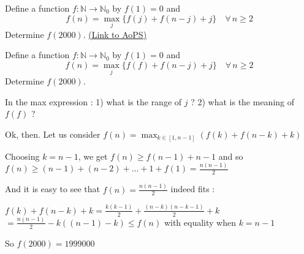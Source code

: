 \begin{problem}
	Define a function $f:\mathbb{N}\rightarrow\mathbb{N}_0$ by $f(1)=0$ and
\[f(n)=\max_j\{ f(j)+f(n-j)+j\}\quad\forall\, n\ge 2 \]
Determine $f(2000)$.
	\flushright \href{https://artofproblemsolving.com/community/c6h387704}{(Link to AoPS)}
\end{problem}



\begin{solution}
	\begin{tcolorbox}Define a function $f:\mathbb{N}\rightarrow\mathbb{N}_0$ by $f(1)=0$ and
\[f(n)=\max_j\{ f(f)+f(n-j)+j\}\quad\forall\, n\ge 2 \]
Determine $f(2000)$.\end{tcolorbox}
In the max expression :
1) what is the range of $j$ ?
2) what is the meaning of $f(f)$ ?
\end{solution}






\begin{solution}
	Ok, then. Let us consider $f(n)=\max_{k\in[1,n-1]}(f(k)+f(n-k)+k)$

Choosing $k=n-1$, we get $f(n)\ge f(n-1)+n-1$ and so $f(n)\ge (n-1)+(n-2)+...+1+f(1)=\frac{n(n-1)}2$

And it is easy to see that $f(n)=\frac{n(n-1)}2$ indeed fits :

$f(k)+f(n-k)+k=\frac{k(k-1)}2+\frac{(n-k)(n-k-1)}2+k$ $=\frac{n(n-1)}2-k((n-1)-k)\le f(n)$ with equality when $k=n-1$

So $\boxed{f(2000)=1999000}$
\end{solution}



